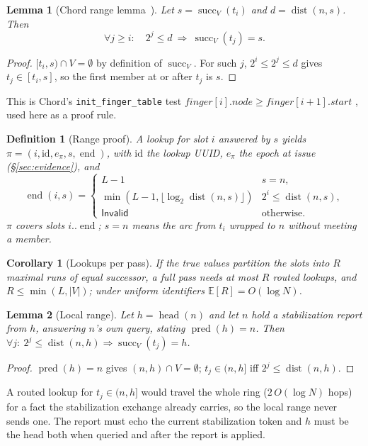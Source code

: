\documentclass[journal]{IEEEtran}
\newtheorem{definition}{Definition}
\newtheorem{lemma}{Lemma}
\newtheorem{corollary}{Corollary}
\newcommand{\dist}{\operatorname{dist}}
\newcommand{\succf}{\operatorname{succ}}
\newcommand{\pred}{\operatorname{pred}}
\newcommand{\head}{\operatorname{head}}
\newcommand{\pend}{\operatorname{end}}
\newcommand{\Invalid}{\mathsf{Invalid}}
\begin{document}
\begin{lemma}[Chord range lemma~\cite{Stoica2001}]\label{lem:range}
Let $s=\succf_V(t_i)$ and $d=\dist(n,s)$.  Then
\[
\forall j\ge i:\quad 2^{j}\le d\ \Rightarrow\ \succf_V(t_j)=s .
\]
\end{lemma}
\begin{proof}
$[t_i,s)\cap V=\emptyset$ by definition of $\succf_V$.  For such $j$,
$2^{i}\le 2^{j}\le d$ gives $t_j\in[t_i,s]$, so the first member at or after
$t_j$ is $s$.
\end{proof}

This is Chord's \texttt{init\_finger\_table} test
$\mathit{finger}[i].\mathit{node}\ge\mathit{finger}[i{+}1].\mathit{start}$
\cite[Fig.~6]{Stoica2001}, used here as a proof rule.

\begin{definition}[Range proof]\label{def:proof}
A lookup for slot $i$ answered by $s$ yields
$\pi=(i,\mathrm{id},e_\pi,s,\pend)$, with $\mathrm{id}$ the lookup UUID,
$e_\pi$ the epoch at issue (\S\ref{sec:evidence}), and
\[
\pend(i,s)=
\begin{cases}
L-1 & s=n,\\
\min(L{-}1,\lfloor\log_2\dist(n,s)\rfloor) & 2^{i}\le\dist(n,s),\\
\Invalid & \text{otherwise.}
\end{cases}
\]
$\pi$ covers slots $i..\pend$; $s=n$ means the arc from $t_i$ wrapped to
$n$ without meeting a member.
\end{definition}

\begin{corollary}[Lookups per pass]\label{cor:lookups}
If the true values partition the slots into $R$ maximal runs of equal
successor, a full pass needs at most $R$ routed lookups, and
$R\le\min(L,|V|)$; under uniform identifiers $\mathbb{E}[R]=O(\log N)$.
\end{corollary}

\begin{lemma}[Local range]\label{lem:local}
Let $h=\head(n)$ and let $n$ hold a stabilization report from $h$,
answering $n$'s own query, stating $\pred(h)=n$.  Then
$\forall j:\ 2^{j}\le\dist(n,h)\Rightarrow\succf_V(t_j)=h$.
\end{lemma}
\begin{proof}
$\pred(h)=n$ gives $(n,h)\cap V=\emptyset$; $t_j\in(n,h]$ iff
$2^{j}\le\dist(n,h)$.
\end{proof}

A routed lookup for $t_j\in(n,h]$ would travel the whole ring
($2\,O(\log N)$ hops) for a fact the stabilization exchange already
carries, so the local range never sends one.  The report must echo the
current stabilization token and $h$ must be the head both when queried and
after the report is applied.
\end{document}
